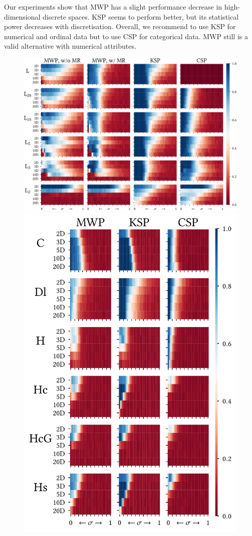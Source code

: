 Our experiments show that \gls{MWP} has a slight performance decrease in high-dimensional discrete spaces. 
\gls{KSP} seems to perform better, but its statistical power decreases with discretisation. 
Overall, we recommend to use \gls{KSP} for numerical and ordinal data but to use \gls{CSP} for categorical data. 
\gls{MWP} still is a valid alternative with numerical attributes. %

\begin{figure}
	\centering \includegraphics[width=0.98\linewidth, trim=0 0.25cm 0 0.25cm]{part2-figures/power_L_thesis-crop-compressed.pdf} \hfill \\
	\vfill
	\hfill
	\vfill
    \includegraphics[width=0.49\linewidth, trim=0 0.25cm 0 0.25cm]{part2-figures/power_1_thesis-compressed.pdf}

\end{figure}
